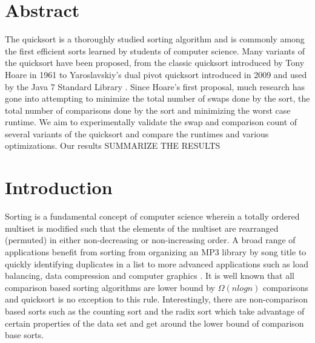 %


\section{Abstract}
    The quicksort is a thoroughly studied sorting algorithm and is commonly among the first efficient sorts learned by students of computer science. Many variants of the quicksort have been proposed, from the classic quicksort introduced by Tony Hoare in 1961 \cite{Hoare01011962} to Yaroslavskiy’s dual pivot quicksort introduced in 2009 and used by the Java 7 Standard Library \cite{kushagra2013multi}. Since Hoare’s first proposal, much research has gone into attempting to minimize the total number of swaps done by the sort, the total number of comparisons done by the sort and minimizing the worst case runtime. We aim to experimentally validate the swap and comparison count of several variants of the quicksort and compare the runtimes and various optimizations. Our results SUMMARIZE THE RESULTS

\section{Introduction}
    Sorting is a fundamental concept of computer science wherein a totally ordered multiset is modified such that the elements of the multiset are rearranged (permuted) in either non-decreasing or non-increasing order. A broad range of applications benefit from sorting from organizing an MP3 library by song title to quickly identifying duplicates in a list to more advanced applications such as load balancing, data compression and computer graphics \cite{sortingSlides}. It is well known that all comparison based sorting algorithms are lower bound by $\Omega(n log n)$ comparisons \cite{Cormen:2001:IA:580470} and quicksort is no exception to this rule. Interestingly, there are non-comparison based sorts such as the counting sort and the radix sort which take advantage of certain properties of the data set and get around the lower bound of comparison base sorts.
    
